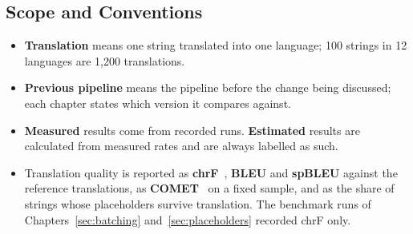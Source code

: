 \subsection{Scope and Conventions}
\begin{itemize}
  \item \textbf{Translation} means one string translated into one language; 100 strings in 12 languages are 1,200
        translations.
  \item \textbf{Previous pipeline} means the pipeline before the change being discussed; each chapter states which
        version it compares against.
  \item \textbf{Measured} results come from recorded runs. \textbf{Estimated} results are calculated from measured rates and
        are always labelled as such.
  \item Translation quality is reported as \textbf{chrF}~\cite{chrf}, \textbf{BLEU} and \textbf{spBLEU} against the
        reference translations, as \textbf{COMET}~\cite{comet} on a fixed sample, and as the share of strings whose
        placeholders survive translation. The benchmark runs of Chapters~\ref{sec:batching} and~\ref{sec:placeholders}
        recorded chrF only.
\end{itemize}

